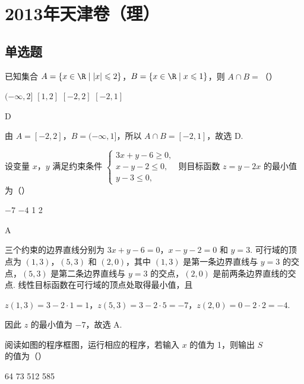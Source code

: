 \chapter{2013年天津卷（理）}

\section{单选题}

\begin{problem}
已知集合 \(A = \{x \in \R \mid |x| \leqslant 2\}\)，\(B = \{x \in \R \mid x \leqslant 1\}\)，则 \(A \cap B =\)（\quad）

\choices
    {\((-\infty, 2]\)}
    {\([1,2]\)}
    {\([-2, 2]\)}
    {\([-2, 1]\)}
\end{problem}

\begin{answer}
D
\end{answer}

\begin{solution}
由 \(A= [-2,2]\)，\(B=(-\infty,1]\)，所以 \(A\cap B=[-2,1]\)，故选 D.
\end{solution}

\begin{problem}
设变量 \(x\)，\(y\) 满足约束条件 \(\begin{cases}
3x + y - 6 \geqslant 0,\\
x - y - 2 \leqslant 0,\\
y - 3 \leqslant 0,
\end{cases}\) 则目标函数 \(z = y - 2x\) 的最小值为（\quad）

\choices
    {\(-7\)}
    {\(-4\)}
    {1}
    {2}
\end{problem}

\begin{answer}
A
\end{answer}

\begin{solution}
三个约束的边界直线分别为 \(3x+y-6=0\)，\(x-y-2=0\) 和 \(y=3\). 可行域的顶点为 \((1,3)\)，\((5,3)\) 和 \((2,0)\)，其中 \((1,3)\) 是第一条边界直线与 \(y=3\) 的交点，\((5,3)\) 是第二条边界直线与 \(y=3\) 的交点，\((2,0)\) 是前两条边界直线的交点. 线性目标函数在可行域的顶点处取得最小值，且

\(z(1,3)=3-2\cdot1=1\)，\(z(5,3)=3-2\cdot5=-7\)，\(z(2,0)=0-2\cdot2=-4\).

因此 \(z\) 的最小值为 \(-7\)，故选 A.
\end{solution}

\begin{problem}
阅读如图的程序框图，运行相应的程序，若输入 \(x\) 的值为 1，则输出 \(S\) 的值为（\quad）


\choices
    {64}
    {73}
    {512}
    {585}
\end{problem}


